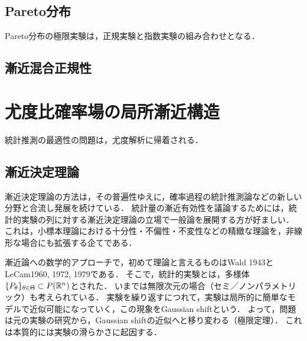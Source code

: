 \documentclass[uplatex,dvipdfmx]{jsreport}
\begin{document}
\subsection{Pareto分布}

\begin{tcolorbox}[colframe=ForestGreen, colback=ForestGreen!10!white,breakable,colbacktitle=ForestGreen!40!white,coltitle=black,fonttitle=\bfseries\sffamily,
title=]
    Pareto分布の極限実験は，正規実験と指数実験の組み合わせとなる．
\end{tcolorbox}

\subsection{漸近混合正規性}

\section{尤度比確率場の局所漸近構造}

\begin{tcolorbox}[colframe=ForestGreen, colback=ForestGreen!10!white,breakable,colbacktitle=ForestGreen!40!white,coltitle=black,fonttitle=\bfseries\sffamily,
title=]
    統計推測の最適性の問題は，尤度解析に帰着される．
\end{tcolorbox}

\subsection{漸近決定理論}

\begin{tcolorbox}[colframe=ForestGreen, colback=ForestGreen!10!white,breakable,colbacktitle=ForestGreen!40!white,coltitle=black,fonttitle=\bfseries\sffamily,
title=]
    漸近決定理論の方法は，その普遍性ゆえに，確率過程の統計推測論などの新しい分野と合流し発展を続けている．
    統計量の漸近有効性を議論するためには，統計的実験の列に対する漸近決定理論の立場で一般論を展開する方が好ましい．
    これは，小標本理論における十分性・不偏性・不変性などの精緻な理論を，非線形な場合にも拡張する企てである．
\end{tcolorbox}

\begin{history}
    漸近論への数学的アプローチで，初めて理論と言えるものはWald 1943とLeCam1960, 1972, 1979である．
    そこで，統計的実験とは，多様体$\{P_\theta\}_{\theta\in\Theta}\subset P(\mathbb{R}^n)$とされた．
    いまでは無限次元の場合（セミ／ノンパラメトリック）も考えられている．
    実験を繰り返すにつれて，実験は局所的に簡単なモデルで近似可能になっていく，この現象をGaussian shiftという．
    よって，問題は元の実験の研究から，Gaussian shiftの近似へと移り変わる（極限定理）．
    これは本質的には実験の滑らかさに起因する．
\end{history}
\end{document}

